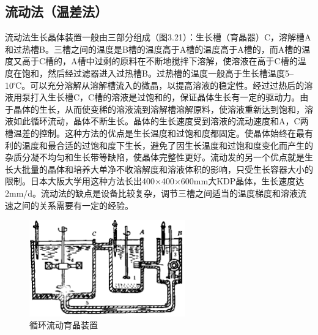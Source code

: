 ﻿\subsection{流动法（温差法）}
流动法生长晶体装置一般由三部分组成（图3.21）：生长槽（育晶器）C，溶解槽A和过热槽B。三槽之间的温度是B槽的温度高于A槽的温度高于A槽的，而A槽的温度又高于C槽的，A槽中过剩的原料在不断地搅拌下溶解，使溶液在高于C槽的温度在饱和，然后经过滤器进入过热槽B。过热槽的温度一般高于生长槽温度5--10℃。可以充分溶解从溶解槽流入的微晶，以提高溶液的稳定性。经过过热后的溶液用泵打入生长槽C，C槽的溶液是过饱和的，保证晶体生长有一定的驱动力。由于晶体的生长，从而使变稀的溶液流到溶解槽溶解原料，使溶液重新达到饱和，溶液如此循环流动，晶体不断生长。晶体的生长速度受到溶液的流动速度和A，C两槽温差的控制。这种方法的优点是生长温度和过饱和度都固定。使晶体始终在最有利的温度和最合适的过饱和度下生长，避免了因生长温度和过饱和度变化而产生的杂质分凝不均匀和生长带等缺陷，使晶体完整性更好。流动发的另一个优点就是生长大批量的晶体和培养大单净不收溶解度和溶液体积的影响，只受生长容器大小的限制。日本大阪大学用这种方法长出400$\times$400$\times$600mm大KDP晶体，生长速度达2mm/d。流动法的缺点是设备比较复杂，调节三槽之间适当的温度梯度和溶液流速之间的关系需要有一定的经验。
\begin{figure}[h]
 \centering
 \includegraphics[width=0.6\textwidth]{fig/cp03/img3.21.jpg}
 \caption{循环流动育晶装置}
\end{figure}

